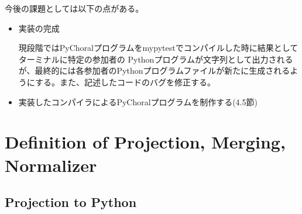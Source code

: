 \documentclass{thesis}
\begin{document}
今後の課題としては以下の点がある。
\begin{itemize}
  \item 実装の完成
  
  現段階ではPyChoralプログラムをmypytestでコンパイルした時に結果としてターミナルに特定の参加者の
  Pythonプログラムが文字列として出力されるが、最終的には各参加者のPythonプログラムファイルが新たに生成されるようにする。また、記述したコードのバグを修正する。
  \item 実装したコンパイラによるPyChoralプログラムを制作する(4.5節)
    
\end{itemize}





\appendix

\chapter{Definition of Projection, Merging, Normalizer}
\section{Projection to Python}
\end{document}
